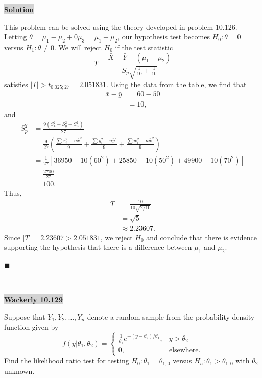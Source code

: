 \documentclass[12pt]{article}
\newcommand{\mybox}{%
    \collectbox{%
        \setlength{\fboxsep}{2pt}%
        \fbox{\BOXCONTENT}%
    }%
}
\begin{document}
\noindent\mybox{\colorbox{lightgray}{\textbf{Solution}}} \hspace{3mm}\hrulefill

\noindent This problem can be solved using the theory developed in problem 10.126. Letting $\theta = \mu_1 - \mu_2 + 0\mu_3 = \mu_1-\mu_2$, our hypothesis test becomes $H_0: \theta = 0$ versus $H_1: \theta \neq 0$. We will reject $H_0$ if the test statistic $$T = \frac{\bar{X}-\bar{Y}-(\mu_1-\mu_2)}{S_p\sqrt{\frac{1}{10}+\frac{1}{10}}}$$ satisfies $|T| > t_{0.025; 27} = 2.051831$. Using the data from the table, we find that
\begin{align}
\bar{x} - \bar{y} &= 60 - 50 \\
&= 10,
\end{align}
and
\begin{align}
S_p^2 &= \frac{9(S_x^2+S_y^2+S_w^2)}{27} \\
&= \frac{9}{27}\left( \frac{\sum x_i^2 - n\bar{x}^2}{9} + \frac{\sum y_i^2 - n\bar{y}^2}{9} + \frac{\sum w_i^2 - n\bar{w}^2}{9}\right) \\
&= \frac{1}{27}[36950 - 10(60^2) + 25850 - 10(50^2) + 49900 - 10(70^2)] \\
&= \frac{2700}{27} \\
&= 100.
\end{align}
Thus, 
\begin{align}
T &= \frac{10}{10\sqrt{2/10}} \\
&= \sqrt{5} \\
& \approx 2.23607.
\end{align}
Since $|T| = 2.23607 > 2.051831$, we reject $H_0$ and conclude that there is evidence supporting the hypothesis that there is a difference between $\mu_1$ and $\mu_2$. 

\hfill$\blacksquare$

\vfill
\begin{center}
\end{center}
\begin{center}
\vspace{-0.6cm}
\hrulefill \\
\vspace{-0.7cm}
\hrulefill
\end{center}

\pagebreak

\noindent\mybox{\colorbox{lightgray}{\textbf{Wackerly 10.129}}}\hspace{3mm}\hrulefill 

\noindent Suppose that $Y_1, Y_2, \ldots, Y_n$ denote a random sample from the probability density function given by 
$$
f(y|\theta_1, \theta_2) = 
\begin{cases}
\frac{1}{\theta_1}e^{-(y-\theta_2)/\theta_1}, & y > \theta_2 \\
0, & \text{elsewhere.}
\end{cases}
$$
Find the likelihood ratio test for testing $H_0:\theta_1 = \theta_{1, 0}$ versus $H_a: \theta_1 > \theta_{1, 0}$ with $\theta_2$ unknown.
\end{document}
